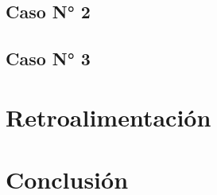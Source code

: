 \documentclass[12pt, letterpaper]{article}
\begin{document}
\subsection{Caso N° 2}

\subsection{Caso N° 3}

\clearpage

\section{Retroalimentación}



\clearpage


\section{Conclusión}

\end{document}
